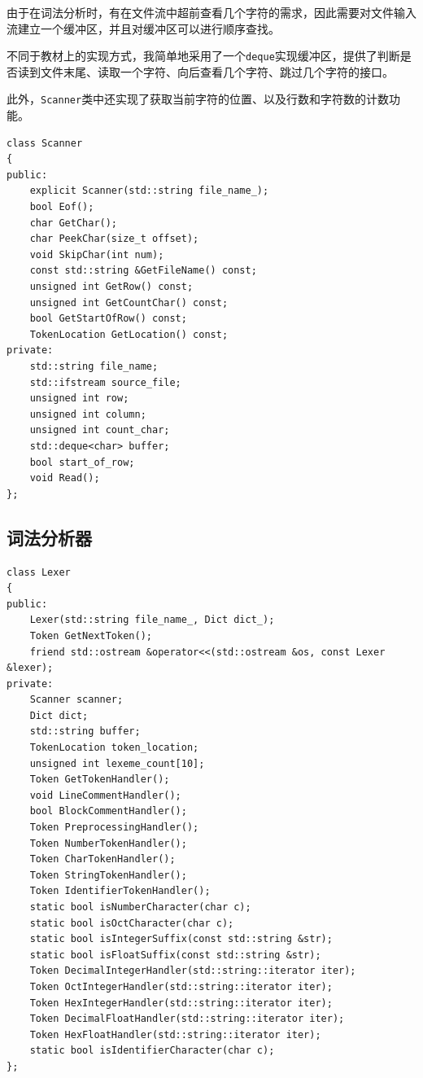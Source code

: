 \documentclass[lang=cn,11pt,a4paper,cite=authornum]{paper}
\begin{document}
由于在词法分析时，有在文件流中超前查看几个字符的需求，因此需要对文件输入流建立一个缓冲区，并且对缓冲区可以进行顺序查找。

不同于教材上的实现方式，我简单地采用了一个\texttt{deque}实现缓冲区，提供了判断是否读到文件末尾、读取一个字符、向后查看几个字符、跳过几个字符的接口。

此外，\texttt{Scanner}类中还实现了获取当前字符的位置、以及行数和字符数的计数功能。

\begin{code}
\begin{verbatim}
class Scanner
{
public:
    explicit Scanner(std::string file_name_);
    bool Eof();
    char GetChar();
    char PeekChar(size_t offset);
    void SkipChar(int num);
    const std::string &GetFileName() const;
    unsigned int GetRow() const;
    unsigned int GetCountChar() const;
    bool GetStartOfRow() const;
    TokenLocation GetLocation() const;
private:
    std::string file_name;
    std::ifstream source_file;
    unsigned int row;
    unsigned int column;
    unsigned int count_char;
    std::deque<char> buffer;
    bool start_of_row;
    void Read();
};
\end{verbatim}
\end{code}

\subsection{词法分析器}

\begin{code}
\begin{verbatim}
class Lexer
{
public:
    Lexer(std::string file_name_, Dict dict_);
    Token GetNextToken();
    friend std::ostream &operator<<(std::ostream &os, const Lexer &lexer);
private:
    Scanner scanner;
    Dict dict;
    std::string buffer;
    TokenLocation token_location;
    unsigned int lexeme_count[10];
    Token GetTokenHandler();
    void LineCommentHandler();
    bool BlockCommentHandler();
    Token PreprocessingHandler();
    Token NumberTokenHandler();
    Token CharTokenHandler();
    Token StringTokenHandler();
    Token IdentifierTokenHandler();
    static bool isNumberCharacter(char c);
    static bool isOctCharacter(char c);
    static bool isIntegerSuffix(const std::string &str);
    static bool isFloatSuffix(const std::string &str);
    Token DecimalIntegerHandler(std::string::iterator iter);
    Token OctIntegerHandler(std::string::iterator iter);
    Token HexIntegerHandler(std::string::iterator iter);
    Token DecimalFloatHandler(std::string::iterator iter);
    Token HexFloatHandler(std::string::iterator iter);
    static bool isIdentifierCharacter(char c);
};
\end{verbatim}
\end{code}
\end{document}
